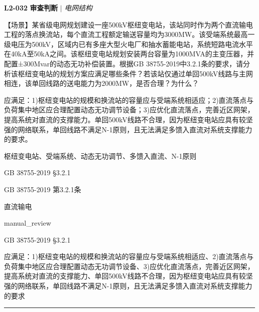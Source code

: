 \documentclass[11pt,a4paper]{ctexart}
\begin{document}
\noindent\textbf{L2-032} \hfill \textbf{审查判断} $|$ \textit{电网结构}
\begin{description}[leftmargin=1.5em,style=nextline,font=\normalfont]
  \item[Q:] 【场景】某省级电网规划建设一座500kV枢纽变电站，该站同时作为两个直流输电工程的落点换流站，每个直流工程额定输送容量均为3000MW。该受端系统最高一级电压为500kV，区域内已有多座大型火电厂和抽水蓄能电站，系统短路电流水平在40kA至50kA之间。该枢纽变电站规划安装两台容量为1000MVA的主变压器，并配置±300Mvar的动态无功补偿装置。根据GB 38755-2019中3.2.1条的要求，请分析该枢纽变电站的规划方案应满足哪些条件？若该站仅通过单回500kV线路与主网相连，该单回线路的送电能力为2000MW，是否合理？为什么？
  \item[A:] 应满足：1)枢纽变电站的规模和换流站的容量应与受端系统相适应；2)直流落点与负荷集中地区应合理配置动态无功调节设备；3)应优化直流落点，完善近区网架，提高系统对直流的支撑能力。单回500kV线路不合理，因为枢纽变电站应具有较坚强的网络联系，单回线路不满足N-1原则，且无法满足多馈入直流对系统支撑能力的要求。
  \item[KW:] 枢纽变电站、受端系统、动态无功调节、多馈入直流、N-1原则
  \item[标准:] GB 38755-2019 §3.2.1
  \item[条款溯源:] GB 38755-2019 第3.2.1条
  \item[主题:] 直流输电
  \item[评分方式:] manual\_review
  \item[Rubric条款:] GB 38755-2019 §3.2.1
  \item[Rubric判据:] 应满足：1)枢纽变电站的规模和换流站的容量应与受端系统相适应、2)直流落点与负荷集中地区应合理配置动态无功调节设备、3)应优化直流落点，完善近区网架，提高系统对直流的支撑能力、单回500kV线路不合理，因为枢纽变电站应具有较坚强的网络联系，单回线路不满足N-1原则，且无法满足多馈入直流对系统支撑能力的要求

\end{description}
\vspace{4pt}
\hrule
\vspace{6pt}
\end{document}
